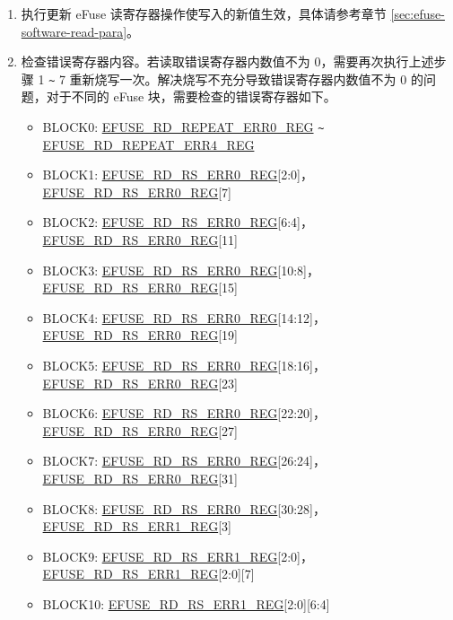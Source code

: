 \documentclass[main\_\_CN.tex]{subfiles}
\begin{document}
\begin{enumerate}
\item 执行更新 eFuse 读寄存器操作使写入的新值生效，具体请参考章节 \ref{sec:efuse-software-read-para}。
\item 检查错误寄存器内容。若读取错误寄存器内数值不为 0，需要再次执行上述步骤 1 \verb+~+ 7 重新烧写一次。解决烧写不充分导致错误寄存器内数值不为 0 的问题，对于不同的 eFuse 块，需要检查的错误寄存器如下。
\begin{itemize}
    \item BLOCK0: \hyperref[regdesc:EFUSERDREPEATERR0REG]{EFUSE\_RD\_REPEAT\_ERR0\_REG} \verb+~+ \hyperref[regdesc:EFUSERDREPEATERR4REG]{EFUSE\_RD\_REPEAT\_ERR4\_REG}
    \item BLOCK1: \hyperref[regdesc:EFUSERDRSERR0REG]{EFUSE\_RD\_RS\_ERR0\_REG}[2:0]，\hyperref[regdesc:EFUSERDRSERR0REG]{EFUSE\_RD\_RS\_ERR0\_REG}[7]
    \item BLOCK2: \hyperref[regdesc:EFUSERDRSERR0REG]{EFUSE\_RD\_RS\_ERR0\_REG}[6:4]，\hyperref[regdesc:EFUSERDRSERR0REG]{EFUSE\_RD\_RS\_ERR0\_REG}[11]
    \item BLOCK3: \hyperref[regdesc:EFUSERDRSERR0REG]{EFUSE\_RD\_RS\_ERR0\_REG}[10:8]，\hyperref[regdesc:EFUSERDRSERR0REG]{EFUSE\_RD\_RS\_ERR0\_REG}[15]
    \item BLOCK4: \hyperref[regdesc:EFUSERDRSERR0REG]{EFUSE\_RD\_RS\_ERR0\_REG}[14:12]，\hyperref[regdesc:EFUSERDRSERR0REG]{EFUSE\_RD\_RS\_ERR0\_REG}[19]
    \item BLOCK5: \hyperref[regdesc:EFUSERDRSERR0REG]{EFUSE\_RD\_RS\_ERR0\_REG}[18:16]，\hyperref[regdesc:EFUSERDRSERR0REG]{EFUSE\_RD\_RS\_ERR0\_REG}[23]
    \item BLOCK6: \hyperref[regdesc:EFUSERDRSERR0REG]{EFUSE\_RD\_RS\_ERR0\_REG}[22:20]，\hyperref[regdesc:EFUSERDRSERR0REG]{EFUSE\_RD\_RS\_ERR0\_REG}[27]
    \item BLOCK7: \hyperref[regdesc:EFUSERDRSERR0REG]{EFUSE\_RD\_RS\_ERR0\_REG}[26:24]，\hyperref[regdesc:EFUSERDRSERR0REG]{EFUSE\_RD\_RS\_ERR0\_REG}[31]
    \item BLOCK8: \hyperref[regdesc:EFUSERDRSERR0REG]{EFUSE\_RD\_RS\_ERR0\_REG}[30:28]，\hyperref[regdesc:EFUSERDRSERR1REG]{EFUSE\_RD\_RS\_ERR1\_REG}[3]
    \item BLOCK9: \hyperref[regdesc:EFUSERDRSERR1REG]{EFUSE\_RD\_RS\_ERR1\_REG}[2:0]，\hyperref[regdesc:EFUSERDRSERR1REG]{EFUSE\_RD\_RS\_ERR1\_REG}[2:0][7]
    \item BLOCK10: \hyperref[regdesc:EFUSERDRSERR1REG]{EFUSE\_RD\_RS\_ERR1\_REG}[2:0][6:4]
\end{itemize}
\end{enumerate}
\end{document}
